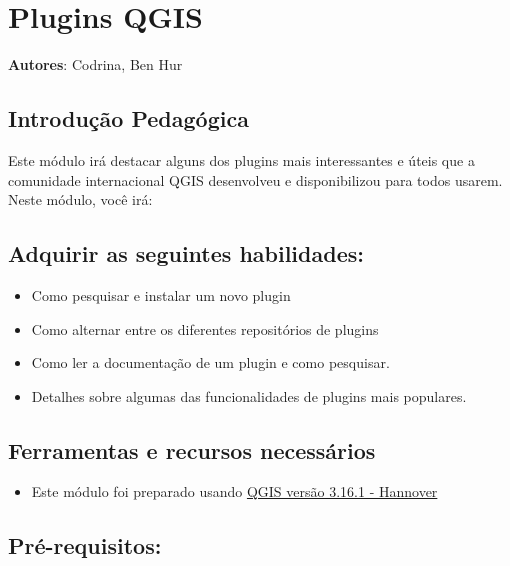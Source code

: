 \documentclass[
]{book}
\providecommand{\tightlist}{%
  \setlength{\itemsep}{0pt}\setlength{\parskip}{0pt}}
\begin{document}
\hypertarget{plugins-qgis}{%
\chapter{Plugins QGIS}\label{plugins-qgis}}

\textbf{Autores}: Codrina, Ben Hur

\hypertarget{introduuxe7uxe3o-pedaguxf3gica-9}{%
\section{Introdução Pedagógica}\label{introduuxe7uxe3o-pedaguxf3gica-9}}

Este módulo irá destacar alguns dos plugins mais interessantes e úteis que a comunidade internacional QGIS desenvolveu e disponibilizou para todos usarem. Neste módulo, você irá:

\hypertarget{adquirir-as-seguintes-habilidades}{%
\section{Adquirir as seguintes habilidades:}\label{adquirir-as-seguintes-habilidades}}

\begin{itemize}
\tightlist
\item
  Como pesquisar e instalar um novo plugin
\item
  Como alternar entre os diferentes repositórios de plugins
\item
  Como ler a documentação de um plugin e como pesquisar.
\item
  Detalhes sobre algumas das funcionalidades de plugins mais populares.
\end{itemize}

\hypertarget{ferramentas-e-recursos-necessuxe1rios-9}{%
\section{Ferramentas e recursos necessários}\label{ferramentas-e-recursos-necessuxe1rios-9}}

\begin{itemize}
\tightlist
\item
  Este módulo foi preparado usando \href{https://qgis.org/en/site/forusers/download.html}{QGIS versão 3.16.1 - Hannover}
\end{itemize}

\hypertarget{pruxe9-requisitos-10}{%
\section{Pré-requisitos:}\label{pruxe9-requisitos-10}}
\end{document}
